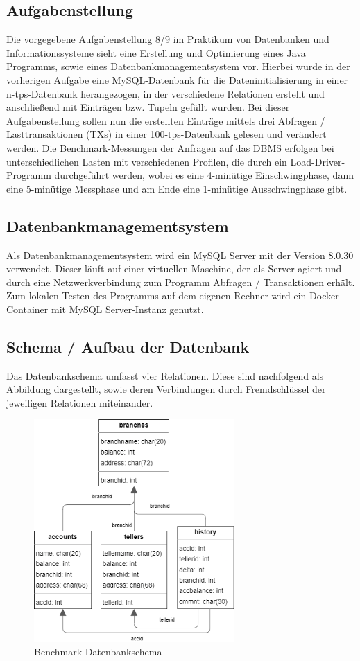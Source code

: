\subsection{Aufgabenstellung}\label{subsec:aufgabenstellung}
Die vorgegebene Aufgabenstellung 8/9 im Praktikum von Datenbanken und Informationssysteme sieht eine Erstellung und Optimierung eines Java Programms, sowie eines Datenbankmanagementsystem vor.
Hierbei wurde in der vorherigen Aufgabe eine MySQL-Datenbank für die Dateninitialisierung in einer n-tps-Datenbank herangezogen, in der verschiedene Relationen erstellt und anschließend mit Einträgen bzw. Tupeln gefüllt wurden.
Bei dieser Aufgabenstellung sollen nun die erstellten Einträge mittels drei Abfragen / Lasttransaktionen (TXs) in einer 100-tps-Datenbank gelesen und verändert werden.
Die Benchmark-Messungen der Anfragen auf das DBMS erfolgen bei unterschiedlichen Lasten mit verschiedenen Profilen, die durch ein Load-Driver-Programm durchgeführt werden, wobei es eine 4-minütige Einschwingphase, dann eine 5-minütige Messphase und am Ende eine 1-minütige Ausschwingphase gibt.
\subsection{Datenbankmanagementsystem}\label{subsec:datenbankmanagementsystem-einleitung}
Als Datenbankmanagementsystem wird ein MySQL Server mit der Version 8.0.30 verwendet.
Dieser läuft auf einer virtuellen Maschine, der als Server agiert und durch eine Netzwerkverbindung zum Programm Abfragen / Transaktionen erhält.
Zum lokalen Testen des Programms auf dem eigenen Rechner wird ein Docker-Container mit MySQL Server-Instanz genutzt.
\subsection{Schema / Aufbau der Datenbank}\label{subsec:schema/aufbau}
Das Datenbankschema umfasst vier Relationen.
Diese sind nachfolgend als Abbildung dargestellt, sowie deren Verbindungen durch Fremdschlüssel der jeweiligen Relationen miteinander.
\begin{figure}[h!]
    \center
    \includegraphics[height=8.5cm]{assets/img/benchmark-datenbank-schema}
    \caption{Benchmark-Datenbankschema}
    \label{fig:benchmark-datenbankschema}
\end{figure}

